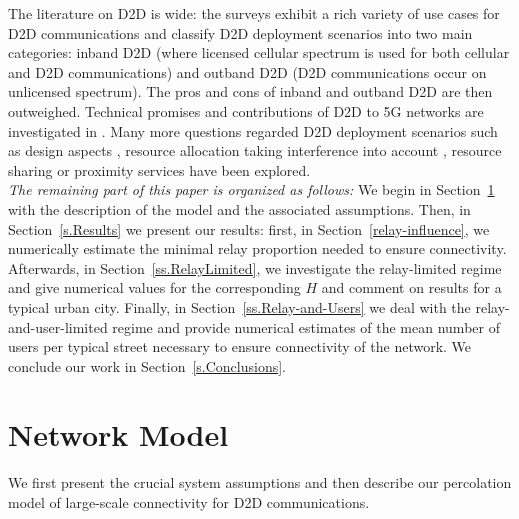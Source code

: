 \documentclass[conference]{IEEEtran}
\begin{document}
The literature on D2D is wide: the surveys \cite{asadi2014survey, gandotra2016device} exhibit a rich variety of use cases for D2D communications and classify D2D deployment scenarios into two main categories: inband D2D (where licensed cellular spectrum is used for both cellular and D2D communications) and outband D2D (D2D communications occur on unlicensed spectrum). The pros and cons of inband and outband D2D are then outweighed. Technical promises and contributions of D2D to 5G networks are investigated in \cite{tehrani2014device}. Many more questions regarded D2D deployment scenarios such as design aspects \cite{fodor2012design}, resource allocation taking interference into account \cite{janis2009interference}, resource sharing \cite{yu2011resource} or proximity services \cite{lin2014overview} have been explored.
\\

{\em The remaining part of this paper is organized as follows:} We begin in Section~\ref{s.Model} with the description of the model and the associated assumptions. Then, in Section~\ref{s.Results} we present our results: first, in Section~\ref{relay-influence}, we numerically estimate the minimal relay proportion needed to ensure connectivity. Afterwards, in Section~\ref{ss.RelayLimited}, we investigate the relay-limited regime and give numerical values for the corresponding $H$ and comment on results for a typical urban city. Finally, in Section~\ref{ss.Relay-and-Users} we deal with the relay-and-user-limited regime and provide numerical estimates of the mean number of users per typical street necessary to ensure connectivity of the network. We conclude our work in Section~\ref{s.Conclusions}.
\section{Network Model}
\label{s.Model}
We first present the crucial system assumptions and then describe our percolation model of large-scale connectivity for D2D communications.
\end{document}
